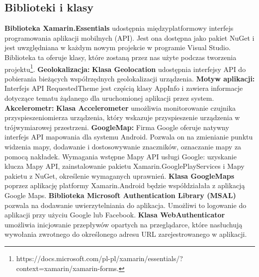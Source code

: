 \subsection{Biblioteki i klasy}
\hspace{1cm} \textbf{Biblioteka Xamarin.Essentials} udostępnia międzyplatformowy interfejs programowania aplikacji mobilnych (API). Jest ona dostępna jako pakiet NuGet i jest uwzględniana w każdym nowym projekcie w programie Visual Studio.
Biblioteka ta oferuje klasy, które zostaną przez nas użyte podczas tworzenia projektu\footnote{https://docs.microsoft.com/pl-pl/xamarin/essentials/?context=xamarin/xamarin-forms\cite{www2}.}.
\newline
\textbf{Geolokalizacja:}
\newline
\textbf{Klasa Geolocation} udostępnia interfejsy API do pobierania bieżących współrzędnych geolokalizacji urządzenia.
\newline
\textbf{Motyw aplikacji:}
\newline
Interfejs API RequestedTheme jest częścią klasy AppInfo i zawiera informacje dotyczące tematu żądanego dla uruchomionej aplikacji przez system.
\newline
\textbf{Akcelerometr:}
\newline
\textbf{Klasa Accelerometer} umożliwia monitorowanie czujnika przyspieszeniomierza urządzenia, który wskazuje przyspieszenie urządzenia w trójwymiarowej przestrzeni.
\newline
\textbf{GoogleMap:}
\newline
Firma Google oferuje natywny interfejs API mapowania dla systemu Android. Pozwala on na zmienianie punktu widzenia mapy, dodawanie i dostosowywanie znaczników, oznaczanie mapy za pomocą nakładek.
\newline
Wymagania wstępne Mapy API usługi Google: uzyskanie klucza Mapy API, zainstalowanie pakietu Xamarin.GooglePlayServices i Mapy pakietu z NuGet, określenie wymaganych uprawnień.
\newline
\textbf{Klasa GoogleMaps} poprzez aplikację platformy Xamarin.Android będzie współdziałała z aplikacją Google Maps.
\newline
\newline
\textbf{Biblioteka Microsoft Authentication Library (MSAL)} pozwala na dodawanie uwierzytelniania do aplikacja. Umożliwi to logowanie do aplikacji przy użyciu Google lub Facebook.
\newline
\textbf{Klasa WebAuthenticator} umożliwia inicjowanie przepływów opartych na przeglądarce, które nasłuchują wywołania zwrotnego do określonego adresu URL zarejestrowanego w aplikacji.
\newline

